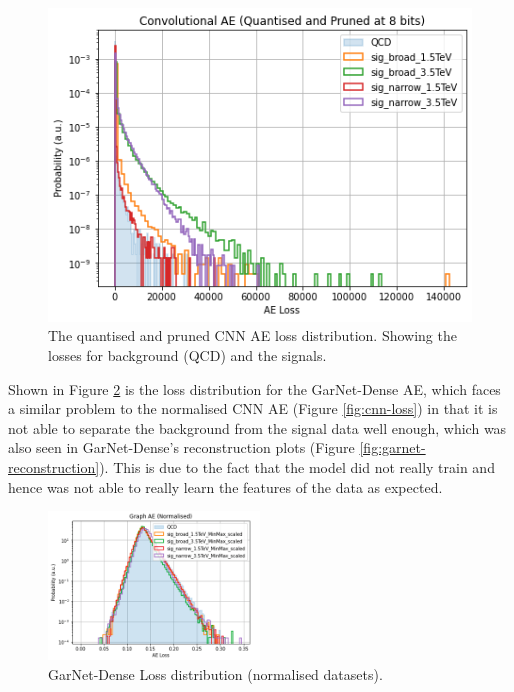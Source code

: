 \documentclass[a4paper]{article}
\theoremstyle{plain}
\theoremstyle{definition}
\begin{document}
\begin{figure}[H]
\begin{minipage}[c]{0.45\linewidth}
                        \includegraphics[width=\textwidth]{cnn-compressed-loss.png}
                        \caption{The quantised and pruned CNN AE loss distribution. Showing the losses for background (QCD) and the signals.}
                        \label{fig:cnn-compressed-loss}
                    \end{minipage}
            \end{figure}

            Shown in Figure \ref{fig:garnet-loss} is the loss distribution for the GarNet-Dense AE, which faces a similar problem to the normalised CNN AE (Figure \ref{fig:cnn-loss}) in that it is not able to separate the background from the signal data well enough, which was also seen in GarNet-Dense's reconstruction plots (Figure \ref{fig:garnet-reconstruction}). This is due to the fact that the model did not really train and hence was not able to really learn the features of the data as expected.

            \begin{figure}[H]
                \centering
                \begin{minipage}[b]{\linewidth}
                    \centering
                    \includegraphics[width=0.5\textwidth]{garnet-loss.png}
                    \small\caption{GarNet-Dense Loss distribution (normalised datasets).}
                    \label{fig:garnet-loss}
                \end{minipage}
            \end{figure}
\end{document}
